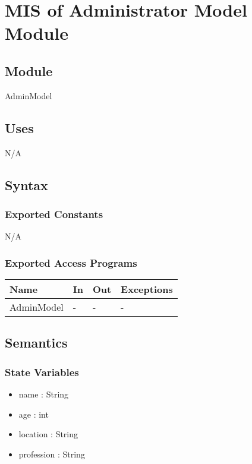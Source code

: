 \documentclass[12pt, titlepage]{article}
\begin{document}
\newpage

\section{MIS of Administrator Model Module } \label{Admin_Model_Module}

\subsection{Module}

AdminModel

\subsection{Uses}

N/A

\subsection{Syntax}

\subsubsection{Exported Constants}

N/A

\subsubsection{Exported Access Programs}

\begin{center}
\begin{tabular}{p{3cm} p{4cm} p{4cm} p{3.5cm}}
\hline
\textbf{Name} & \textbf{In} & \textbf{Out} & \textbf{Exceptions} \\
\hline
AdminModel & - & - & - \\ 
\hline
\end{tabular}
\end{center}

\subsection{Semantics}

\subsubsection{State Variables}

\begin{itemize}
    \item name : String
    \item age : int
    \item location : String
    \item profession : String
\end{itemize}
\end{document}
